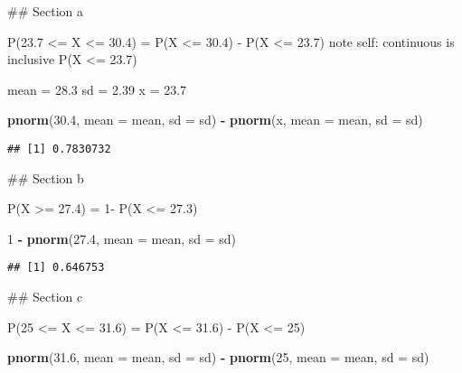 \documentclass[
]{article}
\newenvironment{Shaded}{\begin{snugshade}}{\end{snugshade}}
\newcommand{\AttributeTok}[1]{\textcolor[rgb]{0.13,0.29,0.53}{#1}}
\newcommand{\DecValTok}[1]{\textcolor[rgb]{0.00,0.00,0.81}{#1}}
\newcommand{\FloatTok}[1]{\textcolor[rgb]{0.00,0.00,0.81}{#1}}
\newcommand{\FunctionTok}[1]{\textcolor[rgb]{0.13,0.29,0.53}{\textbf{#1}}}
\newcommand{\NormalTok}[1]{#1}
\newcommand{\OtherTok}[1]{\textcolor[rgb]{0.56,0.35,0.01}{#1}}
\newcommand{\SpecialCharTok}[1]{\textcolor[rgb]{0.81,0.36,0.00}{\textbf{#1}}}
\begin{document}
\#\# Section a

P(23.7 \textless= X \textless= 30.4) = P(X \textless= 30.4) - P(X
\textless= 23.7) note self: continuous is inclusive P(X \textless= 23.7)

\begin{Shaded}
\begin{Highlighting}[]
\NormalTok{  mean }\OtherTok{=} \FloatTok{28.3}
\NormalTok{  sd }\OtherTok{=} \FloatTok{2.39}
\NormalTok{  x }\OtherTok{=}  \FloatTok{23.7}
  
  \FunctionTok{pnorm}\NormalTok{(}\FloatTok{30.4}\NormalTok{, }\AttributeTok{mean =}\NormalTok{ mean, }\AttributeTok{sd =}\NormalTok{ sd) }\SpecialCharTok{{-}} \FunctionTok{pnorm}\NormalTok{(x, }\AttributeTok{mean =}\NormalTok{ mean, }\AttributeTok{sd =}\NormalTok{ sd)}
\end{Highlighting}
\end{Shaded}

\begin{verbatim}
## [1] 0.7830732
\end{verbatim}

\#\# Section b

P(X \textgreater= 27.4) = 1- P(X \textless= 27.3)

\begin{Shaded}
\begin{Highlighting}[]
  \DecValTok{1} \SpecialCharTok{{-}} \FunctionTok{pnorm}\NormalTok{(}\FloatTok{27.4}\NormalTok{, }\AttributeTok{mean =}\NormalTok{ mean, }\AttributeTok{sd =}\NormalTok{ sd)}
\end{Highlighting}
\end{Shaded}

\begin{verbatim}
## [1] 0.646753
\end{verbatim}

\#\# Section c

P(25 \textless= X \textless= 31.6) = P(X \textless= 31.6) - P(X
\textless= 25)

\begin{Shaded}
\begin{Highlighting}[]
  \FunctionTok{pnorm}\NormalTok{(}\FloatTok{31.6}\NormalTok{, }\AttributeTok{mean =}\NormalTok{ mean, }\AttributeTok{sd =}\NormalTok{ sd) }\SpecialCharTok{{-}} \FunctionTok{pnorm}\NormalTok{(}\DecValTok{25}\NormalTok{, }\AttributeTok{mean =}\NormalTok{ mean, }\AttributeTok{sd =}\NormalTok{ sd)}
\end{Highlighting}
\end{Shaded}
\end{document}
